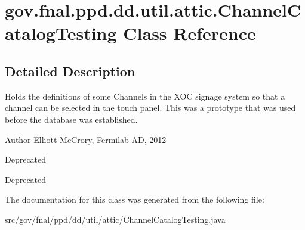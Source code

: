 \hypertarget{classgov_1_1fnal_1_1ppd_1_1dd_1_1util_1_1attic_1_1ChannelCatalogTesting}{\section{gov.\-fnal.\-ppd.\-dd.\-util.\-attic.\-Channel\-Catalog\-Testing Class Reference}
\label{classgov_1_1fnal_1_1ppd_1_1dd_1_1util_1_1attic_1_1ChannelCatalogTesting}
}


\subsection{Detailed Description}
Holds the definitions of some Channels in the X\-O\-C signage system so that a channel can be selected in the touch panel. This was a prototype that was used before the database was established.

\begin{DoxyAuthor}{Author}
Elliott Mc\-Crory, Fermilab A\-D, 2012 
\end{DoxyAuthor}
\begin{DoxyRefDesc}{Deprecated}
\item[\hyperlink{deprecated__deprecated000004}{Deprecated}]\end{DoxyRefDesc}


The documentation for this class was generated from the following file\-:\begin{DoxyCompactItemize}
\item 
src/gov/fnal/ppd/dd/util/attic/Channel\-Catalog\-Testing.\-java\end{DoxyCompactItemize}
